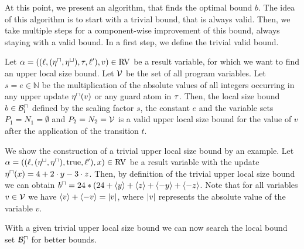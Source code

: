 At this point, we present an algorithm, that finds the optimal bound $b$.
The idea of this algorithm is to start with a trivial bound, that is always valid.
Then, we take multiple steps for a component-wise improvement of this bound, always staying with a valid bound.
In a first step, we define the trivial valid bound.

\begin{definition}
  Let $\alpha = ((\ell,(\eta^\sqcap,\eta^\sqcup),\tau,\ell'),v) \in \text{RV}$ be a result variable, for which we want to find an upper local size bound.
  Let $\mathcal{V}$ be the set of all program variables.
  Let $s = e \in \mathbb{N}$ be the multiplication of the absolute values of all integers occurring in any upper update $\eta^\sqcap(v)$ or any guard atom in $\tau$.
  Then, the local size bound $b \in \mathcal{B}^\sqcap_l$ defined by the scaling factor $s$, the constant $e$ and the variable sets $P_1 = N_1 = \emptyset$ and $P_2 = N_2 = \mathcal{V}$ is a valid upper local size bound for the value of $v$ after the application of the transition $t$.
\end{definition}



We show the construction of a trivial upper local size bound by an example.
Let $\alpha = ((\ell,(\eta^\sqcup,\eta^\sqcap),\text{true},\ell'),x) \in \text{RV}$ be a result variable with the update $\eta^\sqcap(x) = 4 + 2 \cdot y - 3 \cdot z$.
Then, by definition of the trivial upper local size bound we can obtain $b^\sqcap = 24 * (24 + \langle y\rangle + \langle z\rangle + \langle-y\rangle + \langle-z\rangle$.
Note that for all variables $v \in \mathcal{V}$ we have $\langle v\rangle + \langle-v\rangle = \left|v\right|$, where $\left|v\right|$ represents the absolute value of the variable $v$.

With a given trivial upper local size bound we can now search the local bound set $\mathcal{B}^\sqcap_l$ for better bounds.

